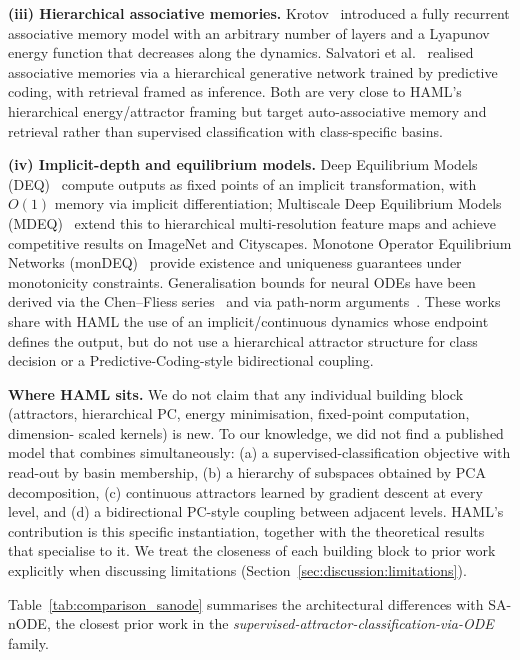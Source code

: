 \documentclass[11pt,a4paper]{article}
\begin{document}
\textbf{(iii) Hierarchical associative memories.} Krotov~\cite{krotov2021hierarchical}
introduced a fully recurrent associative memory model with an arbitrary number of layers
and a Lyapunov energy function that decreases along the dynamics. Salvatori et
al.~\cite{salvatori2021associative} realised associative memories via a hierarchical
generative network trained by predictive coding, with retrieval framed as inference.
Both are very close to HAML's hierarchical energy/attractor framing but target
auto-associative memory and retrieval rather than supervised classification with
class-specific basins.

\textbf{(iv) Implicit-depth and equilibrium models.} Deep Equilibrium Models
(DEQ)~\cite{bai2019deep} compute outputs as fixed points of an implicit
transformation, with $O(1)$ memory via implicit differentiation; Multiscale Deep
Equilibrium Models (MDEQ)~\cite{bai2020multiscale} extend this to hierarchical
multi-resolution feature maps and achieve competitive results on ImageNet and
Cityscapes. Monotone Operator Equilibrium Networks
(monDEQ)~\cite{winston2020monotone} provide existence and uniqueness guarantees under
monotonicity constraints. Generalisation bounds for neural ODEs have been derived via
the Chen--Fliess series~\cite{hanson2024rademacher} and via path-norm
arguments~\cite{marion2023generalization}. These works share with HAML the use of an
implicit/continuous dynamics whose endpoint defines the output, but do not use a
hierarchical attractor structure for class decision or a Predictive-Coding-style
bidirectional coupling.

\textbf{Where HAML sits.} We do not claim that any individual building block
(attractors, hierarchical PC, energy minimisation, fixed-point computation, dimension-
scaled kernels) is new. To our knowledge, we did not find a published model that
combines simultaneously: (a) a supervised-classification objective with read-out by
basin membership, (b) a hierarchy of subspaces obtained by PCA decomposition,
(c) continuous attractors learned by gradient descent at every level, and
(d) a bidirectional PC-style coupling between adjacent levels. HAML's contribution is
this specific instantiation, together with the theoretical results that specialise to
it. We treat the closeness of each building block to prior work explicitly when
discussing limitations (Section~\ref{sec:discussion:limitations}).

Table~\ref{tab:comparison_sanode} summarises the architectural differences with
SA-nODE, the closest prior work in the
\emph{supervised-attractor-classification-via-ODE} family.
\end{document}
